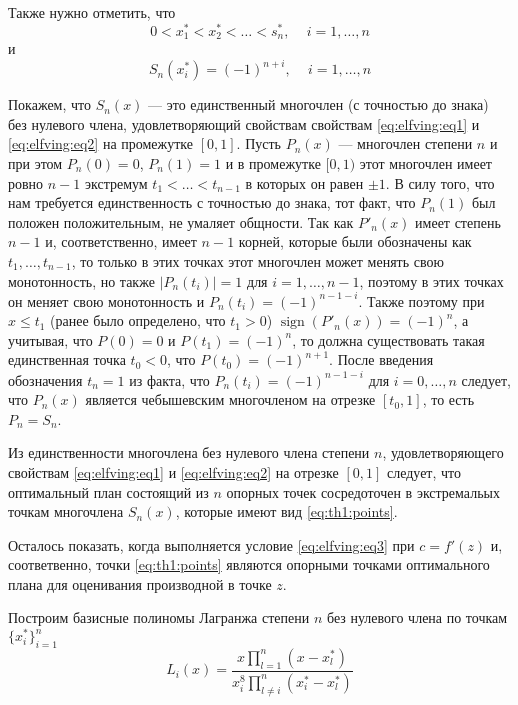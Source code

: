 \documentclass[specialist,
               substylefile = spbu.rtx,
               subf,href,colorlinks=true, 12pt]{disser}
\theoremstyle{definition}
\DeclareMathOperator*{\sign}{sign}
\newcommand\abs[1]{\left\lvert#1\right\rvert}
\begin{document}
	Также нужно отметить, что
	\begin{equation*}
		0 < x_1^* < x_2^* < \ldots < s_n^* , \, \quad i = 1, \ldots, n 
	\end{equation*}
	и
	\begin{equation*}
		S_n(x_i^*) = (-1)^{n + i} , \, \quad i = 1, \ldots, n 
	\end{equation*}
	
	Покажем, что $S_n(x)$ --- это единственный многочлен (с точностью до знака) без нулевого члена, удовлетворяющий свойствам свойствам \eqref{eq:elfving:eq1} и \eqref{eq:elfving:eq2} на промежутке $[0, 1]$. Пусть $P_n(x)$ --- многочлен степени $n$ и при этом $P_n(0) = 0$, $P_n(1) = 1$ и в промежутке $[0, 1)$ этот многочлен имеет ровно $n-1$ экстремум $t_1 < \ldots < t_{n-1}$ в которых он равен $\pm 1$. В силу того, что нам требуется единственность с точностью до знака, тот факт, что $P_n(1)$ был положен положительным, не умаляет общности. Так как $P'_n(x)$ имеет степень $n-1$ и, соответственно, имеет $n-1$ корней, которые были обозначены как $t_1, \ldots, t_{n-1}$, то только в этих точках этот многочлен может менять свою монотонность, но также $\abs{P_n(t_i)} = 1$ для $i = 1, \dots, n-1$, поэтому в этих точках он меняет свою монотонность и $P_n(t_i) = (-1)^{n-1-i}$. Также поэтому при $x \leqslant t_1$ (ранее было определено, что $t_1 > 0$) $\sign(P'_n(x)) = (-1)^n$, а учитывая, что $P(0) = 0$ и $P(t_1) = (-1)^n$, то должна существовать такая единственная точка $t_0 < 0$, что $P(t_0) = (-1)^{n+1}$. После введения обозначения $t_n = 1$ из факта, что $P_n(t_i) = (-1)^{n-1-i}$ для $i = 0, \ldots, n$ следует, что $P_n(x)$ является чебышевским многочленом на отрезке $[t_0, 1]$, то есть $P_n = S_n$.
	
	Из единственности многочлена без нулевого члена степени $n$, удовлетворяющего свойствам \eqref{eq:elfving:eq1} и \eqref{eq:elfving:eq2} на отрезке $[0, 1]$ следует, что оптимальный план состоящий из $n$ опорных точек сосредоточен в экстремальых точкам многочлена $S_n(x)$, которые имеют вид \eqref{eq:th1:points}.
	
	Осталось показать, когда выполняется условие \eqref{eq:elfving:eq3} при $c = f'(z)$ и, соответвенно, точки \eqref{eq:th1:points} являются опорными точками оптимального плана для оценивания производной в точке $z$.

	Построим базисные полиномы Лагранжа степени $n$ без нулевого члена по точкам $\{x_i^*\}_{i=1}^n$
	\begin{equation*}
		L_{i}(x) = \frac{x \prod_{l=1}^n (x - x_l^*)}{x_i^8 \prod_{l \neq i}^n (x_i^* - x_l^*)}
	\end{equation*}	
	
\end{document}

